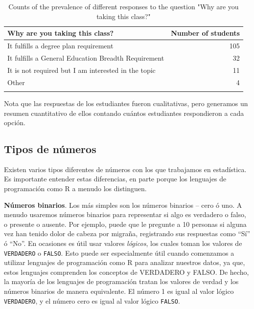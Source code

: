 \documentclass[
  12pt,
]{book}
\begin{document}
\begin{table}

\caption{\label{tab:WhyTakingClass}Counts of the prevalence of different responses to the question "Why are you taking this class?"}
\centering
\begin{tabular}[t]{lr}
\toprule{}
Why are you taking this class? & Number of students\\
\midrule{}
It fulfills a degree plan requirement & 105\\
It fulfills a General Education Breadth Requirement & 32\\
It is not required but I am interested in the topic & 11\\
Other & 4\\
\bottomrule{}
\end{tabular}
\end{table}

Nota que las respuestas de los estudiantes fueron cualitativas, pero generamos un resumen cuantitativo de ellos contando cuántos estudiantes respondieron a cada opción.

\hypertarget{tipos-de-nuxfameros}{%
\subsection{Tipos de números}\label{tipos-de-nuxfameros}}

Existen varios tipos diferentes de números con los que trabajamos en estadística. Es importante entender estas diferencias, en parte porque los lenguajes de programación como R a menudo los distinguen.

\textbf{Números binarios}. Los más simples son los números binarios -- cero ó uno. A menudo usaremos números binarios para representar si algo es verdadero o falso, o presente o ausente. Por ejemplo, puede que le pregunte a 10 personas si alguna vez han tenido dolor de cabeza por migraña, registrando sus respuestas como ``Sí'' ó ``No''. En ocasiones es útil usar valores \emph{lógicos}, los cuales toman los valores de \texttt{VERDADERO} o \texttt{FALSO}. Esto puede ser especialmente útil cuando comenzamos a utilizar lenguajes de programación como R para analizar nuestros datos, ya que, estos lenguajes comprenden los conceptos de VERDADERO y FALSO. De hecho, la mayoría de los lenguajes de programación tratan los valores de verdad y los números binarios de manera equivalente. El número 1 es igual al valor lógico \texttt{VERDADERO}, y el número cero es igual al valor lógico \texttt{FALSO}.
\end{document}
